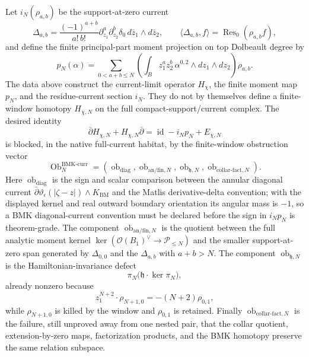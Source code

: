 \documentclass[11pt]{memoir}
\begin{document}
\begin{prop}
  Let \(i_N(\rho_{a,b})\) be the support-at-zero current
  \[
    \Delta_{a,b}
      =
      \frac{(-1)^{a+b}}{a!\,b!}
      \partial_{z_1}^a\partial_{z_2}^b
      \delta_0\,d\bar z_1\wedge d\bar z_2,
    \qquad
    \langle\Delta_{a,b},f\rangle
      =
      \operatorname{Res}_0(\rho_{a,b}f),
  \]
  and define the finite principal-part moment projection on top Dolbeault
  degree by
  \[
    p_N(\alpha)
      =
      \sum_{0<a+b\leq N}
      \left(
        \int_B z_1^az_2^b\,
        \alpha^{0,2}\wedge dz_1\wedge dz_2
      \right)\rho_{a,b}.
  \]
  The data above construct the current-limit operator \(H_\chi\), the
  finite moment map \(p_N\), and the residue-current section \(i_N\).
  They do not by themselves define a finite-window homotopy
  \(H_{\chi,N}\) on the full compact-support/current complex.  The
  desired identity
  \[
    \bar\partial H_{\chi,N}
    +H_{\chi,N}\bar\partial
    =
    \operatorname{id}-i_Np_N+E_{\chi,N}
  \tag{\(\ast_N\)}
  \]
  is blocked, in the native full-current habitat, by the finite-window
  obstruction vector
  \[
    \operatorname{Ob}^{\mathrm{BMK\mbox{-}curr}}_N
    =
    \left(
      \operatorname{ob}_{\mathrm{diag}},
      \operatorname{ob}_{\mathrm{an}/\mathrm{fin},N},
      \operatorname{ob}_{\mathfrak h,N},
      \operatorname{ob}_{\mathrm{collar\mbox{-}fact},N}
    \right).
  \]
  Here \(\operatorname{ob}_{\mathrm{diag}}\) is the sign and scalar
  comparison between the annular diagonal current
  \(\bar\partial\vartheta_\epsilon(|\zeta-z|)\wedge K_{\mathrm{BM}}\)
  and the Matlis derivative-delta convention; with the displayed kernel
  and real outward boundary orientation its angular mass is \(-1\), so a
  BMK diagonal-current convention must be declared before the sign in
  \(i_Np_N\) is theorem-grade.  The component
  \(\operatorname{ob}_{\mathrm{an}/\mathrm{fin},N}\) is the quotient
  between the full analytic moment kernel
  \(\ker(\mathcal O(B_1)^\vee\to\mathcal P_{\le N})\) and the smaller
  support-at-zero span generated by \(\Delta_{0,0}\) and the
  \(\Delta_{a,b}\) with \(a+b>N\).  The component
  \(\operatorname{ob}_{\mathfrak h,N}\) is the Hamiltonian-invariance
  defect
  \[
    \pi_N\bigl(\mathfrak h\cdot\ker\pi_N\bigr),
  \]
  already nonzero because
  \[
    z_1^{N+2}\cdot\rho_{N+1,0}=-(N+2)\rho_{0,1},
  \]
  while \(\rho_{N+1,0}\) is killed by the window and
  \(\rho_{0,1}\) is retained.  Finally
  \(\operatorname{ob}_{\mathrm{collar\mbox{-}fact},N}\) is the failure,
  still unproved away from one nested pair, that the collar quotient,
  extension-by-zero maps, factorization products, and the BMK homotopy
  preserve the same relation subspace.


\end{prop}
\end{document}
